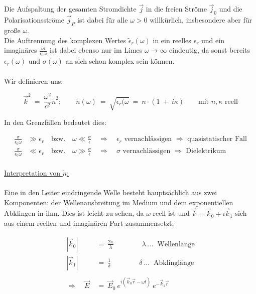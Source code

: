 Die Aufspaltung der gesamten Stromdichte $\vec{j}$ in die freien Ströme $\vec{j}_0$ und die Polarisationsströme $\vec{j}_P$ ist dabei für alle $\omega>0$ willkürlich, insbesondere aber für große $\omega$.\\
Die Auftrennung des komplexen Wertes $\tilde{\epsilon}_r(\omega)$ in ein reelles $\epsilon_r$ und ein imaginäres $\frac{i\sigma}{\epsilon_0\omega}$ ist dabei ebenso nur im Limes $\omega\rightarrow\infty$ eindeutig, da sonst bereits $\epsilon_r(\omega)$ und $\sigma(\omega)$ an sich schon komplex sein können.\\
\ \\
Wir definieren uns: 

\begin{equation*}
\vec{k}^2 \ = \ \frac{\omega^2}{c^2}\tilde{n}^2; \qquad \tilde{n}(\omega)  \ = \  \sqrt{\epsilon_r(\omega} \ = \ n \cdot (1 \ + \ i\kappa) \qquad\text{mit } n, \kappa \text{ reell}
\end{equation*}

In den Grenzfällen bedeutet dies:

\begin{align*}
\frac{\sigma}{\epsilon_0\omega}&\gg\epsilon_r \quad \text{bzw.} \quad \omega\ll \frac{\sigma}{\epsilon} \quad\Rightarrow\quad \epsilon_r \text{ vernachlässigen }\Rightarrow \text{ quasistatischer Fall}\\
\frac{\sigma}{\epsilon_0\omega}&\ll\epsilon_r \quad\text{bzw.}\quad \omega\gg\frac{\sigma}{\epsilon} \quad\Rightarrow\quad \sigma\text{ vernachlässigen }\Rightarrow\text{ Dielektrikum}
\end{align*}
\ \\
\underline{Interpretation von $\tilde{n}$:}\\
\ \\
Eine in den Leiter eindringende Welle besteht hauptsächlich aus zwei Komponenten: der Wellenausbreitung im Medium und dem exponentiellen Abklingen in ihm. Dies ist leicht zu sehen, da $\omega$ reell ist und $\vec{k}=\vec{k}_0 + i\vec{k}_1$ sich aus einem reellen und imaginären Part zusammensetzt:

\begin{align*}
|\vec{k}_0| \ &= \  \frac{2\pi}{\lambda} \qquad \qquad \lambda \ \ldots \ \text{ Wellenlänge}\\
|\vec{k}_1| \ &= \  \frac{1}{\delta} \qquad \qquad \delta \ \ldots\ \text{ Abklinglänge}\\
\ \\
\Rightarrow \quad \vec{E}  \ &= \ \vec{E}_0 \ e^{i\left(\vec{k}_0\vec{r}-\omega t\right)} \ e^{-\vec{k}_1 \vec{r}} 
\end{align*}

